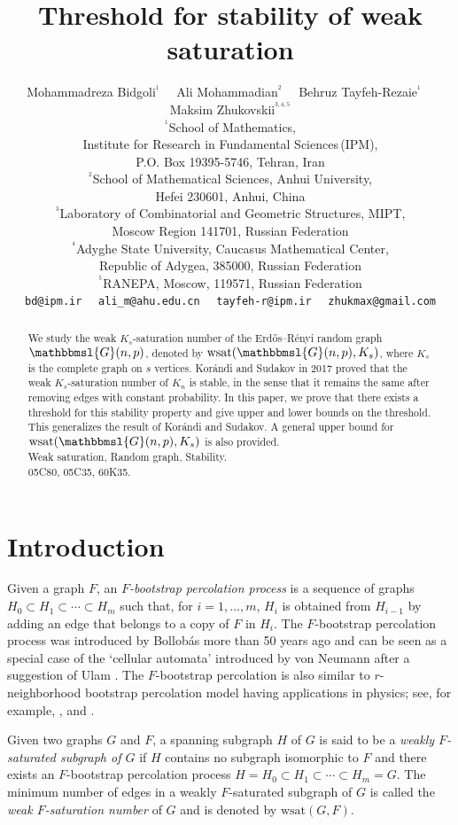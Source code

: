 \documentclass[hidelinks, 11pt]{article}
\title{\bf{Threshold for  stability of weak saturation}\\[4mm]}
\author{
{\normalsize Mohammadreza Bidgoli}$^{^1}$  \, \,    {\normalsize Ali Mohammadian}$^{^2}$   \, \,   {\normalsize   Behruz Tayfeh-Rezaie}$^{^1}$  \, \,  {\normalsize  Maksim Zhukovskii}$^{^{3,4,5}}$ \\[6mm]
$^{^1}${\normalsize School of Mathematics,} \\
{\normalsize Institute for Research in Fundamental Sciences\,(IPM),} \\
{\normalsize P.O. Box 19395-5746, Tehran, Iran}\\[2mm]
$^{^2}${\normalsize School of Mathematical Sciences, Anhui University,} \\
{\normalsize Hefei 230601, Anhui,  China} \\[2mm]
$^{^3}${\normalsize Laboratory of Combinatorial and Geometric Structures, MIPT,} \\
{\normalsize Moscow Region 141701, Russian Federation} \\[2mm]
$^{^4}${\normalsize Adyghe State University, Caucasus Mathematical Center,} \\
{\normalsize Republic of Adygea, 385000, Russian Federation} \\[2mm]
$^{^5}${\normalsize RANEPA, Moscow, 119571, Russian Federation} \\[4mm]
{\normalsize \texttt{bd@ipm.ir}}  \, \,  {\normalsize \texttt{ali\_m@ahu.edu.cn}} \, \,   {\normalsize \texttt{tayfeh-r@ipm.ir}}  \, \,    {\normalsize \texttt{zhukmax@gmail.com}}\\[6mm]
}
\date{}
\theoremstyle{plain}
\theoremstyle{definition}
\begin{document}
\maketitle


\begin{abstract}
We study  the weak $K_s$-saturation number of the Erd\H{o}s--R\'{e}nyi random graph $\mathbbmsl{G}(n, p)$, denoted by $\mathrm{wsat}(\mathbbmsl{G}(n, p), K_s)$, where $K_s$ is the complete graph on $s$ vertices. Kor\'{a}ndi and Sudakov  in 2017   proved that the weak $K_s$-saturation number of $K_n$ is stable,  in the sense that    it remains the same after removing edges with constant probability. In this paper, we prove that there exists a threshold  for this stability property and give upper and lower bounds on the threshold.  This generalizes    the result  of Kor\'{a}ndi  and Sudakov.   A general upper bound for  $\mathrm{wsat}(\mathbbmsl{G}(n, p), K_s)$ is also provided. \\[3mm]
    Weak saturation,  Random graph, Stability. \\[1mm]
    05C80, 05C35, 60K35. \\[6mm]
\end{abstract}



\section{Introduction}


Given   a graph $F$, an {\sl $F$-bootstrap percolation process} is a sequence of graphs $H_0\subset H_1\subset\cdots\subset H_m$ such that, for   $i=1,\ldots,m$, $H_i$ is obtained from $H_{i-1}$ by adding an edge that belongs to a copy of $F$ in $H_i$. The $F$-bootstrap percolation process was introduced by Bollob\'{a}s more than 50 years ago \cite{bol} and can be seen as a special case of the `cellular automata' introduced by von Neumann \cite{Neumann} after a suggestion of Ulam \cite{Ulam}. The  $F$-bootstrap percolation is also similar to $r$-neighborhood bootstrap percolation model having applications in physics; see, for example, \cite{Adler}, \cite{Fontes}   and \cite{Morris}.


Given two graphs $G$ and $F$,  a spanning subgraph  $H$  of $G$  is  said to be a  {\sl weakly $F$-saturated subgraph of $G$} if $H$ contains no subgraph  isomorphic to $F$ and there exists an $F$-bootstrap percolation process $H=H_0\subset H_1\subset\cdots\subset H_m=G$. The  minimum number of edges  in  a weakly $F$-saturated  subgraph of $G$ is called the {\sl weak $F$-saturation number} of $G$ and is denoted by $\mathrm{wsat}(G, F)$.
\end{document}
